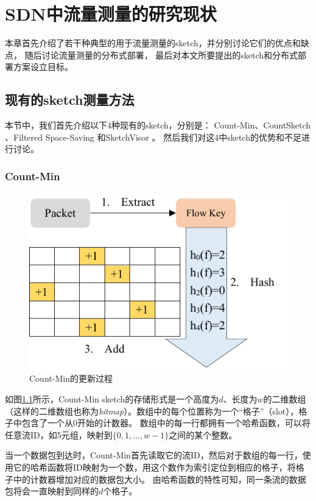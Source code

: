 \chapter{SDN中流量测量的研究现状}\label{chap:sketch}

本章首先介绍了若干种典型的用于流量测量的sketch，并分别讨论它们的优点和缺点，
随后讨论流量测量的分布式部署，
最后对本文所要提出的sketch和分布式部署方案设立目标。

\section{现有的sketch测量方法}\label{sec:observation}
本节中，我们首先介绍以下4种现有的sketch，分别是：
Count-Min\cite{cormode2004improved}、CountSketch \cite{charikar2004finding}、Filtered Space-Saving \cite{homem2010finding}和SketchVisor \cite{huang2017sketchvisor}。
然后我们对这4中sketch的优势和不足进行讨论。

\subsection{Count-Min\cite{cormode2004improved}}

\begin{figure}[ht]
	\centering
	\includegraphics[width=0.7\linewidth]{fig/countmin2.pdf}
	\caption{Count-Min的更新过程}\label{fig:countmin}
\end{figure}

如图\ref{fig:countmin}所示，Count-Min sketch的存储形式是一个高度为$d$、长度为$w$的二维数组（这样的二维数组也称为\textit{bitmap}）。数组中的每个位置称为一个“格子”（slot），格子中包含了一个从0开始的计数器。
数组中的每一行都拥有一个哈希函数，可以将任意流ID，如5元组，映射到$\{0,1,...,w-1\}$之间的某个整数。

当一个数据包到达时，Count-Min首先读取它的流ID，然后对于数组的每一行，使用它的哈希函数将ID映射为一个数，用这个数作为索引定位到相应的格子，将格子中的计数器增加对应的数据包大小。
由哈希函数的特性可知，同一条流的数据包将会一直映射到同样的$d$个格子。

